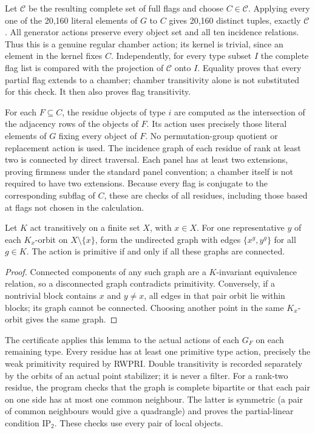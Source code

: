 \documentclass[11pt]{article}
\begin{document}
Let $\mathcal C$ be the resulting complete set of full flags and choose
$C\in\mathcal C$. Applying every one of the 20,160 literal elements of
$G$ to $C$ gives 20,160 distinct tuples, exactly $\mathcal C$. All generator
actions preserve every object set and all ten incidence relations. Thus
this is a genuine regular chamber action; its kernel is trivial, since
an element in the kernel fixes $C$. Independently, for every type subset
$I$ the complete flag list is compared with the projection of $\mathcal C$
onto $I$. Equality proves that every partial flag extends to a chamber;
chamber transitivity alone is not substituted for this check. It then also
proves flag transitivity.

For each $F\subseteq C$, the residue objects of type $i$ are computed as
the intersection of the adjacency rows of the objects of $F$. Its action
uses precisely those literal elements of $G$ fixing every object of $F$.
No permutation-group quotient or replacement action is used. The incidence
graph of each residue of rank at least two is connected by direct traversal.
Each panel has at least two extensions, proving firmness under the standard
panel convention; a chamber itself is not required to have two extensions.
Because every flag is conjugate to the corresponding subflag of $C$, these
are checks of all residues, including those based at flags not chosen in
the calculation.

\begin{lemma}
Let $K$ act transitively on a finite set $X$, with $x\in X$. For one
representative $y$ of each $K_x$-orbit on $X\setminus\{x\}$, form the
undirected graph with edges $\{x^g,y^g\}$ for all $g\in K$.
The action is primitive if and only if all these graphs are connected.
\end{lemma}
\begin{proof}
Connected components of any such graph are a $K$-invariant equivalence
relation, so a disconnected graph contradicts primitivity. Conversely, if
a nontrivial block contains $x$ and $y\ne x$, all edges in that pair orbit
lie within blocks; its graph cannot be connected. Choosing another point
in the same $K_x$-orbit gives the same graph.
\end{proof}

The certificate applies this lemma to the actual actions of each $G_F$
on each remaining type. Every residue has at least one primitive type
action, precisely the weak primitivity required by RWPRI. Double
transitivity is recorded separately by the orbits of an actual point
stabilizer; it is never a filter. For a rank-two residue, the program
checks that the graph is complete bipartite or that each pair on one side
has at most one common neighbour. The latter is symmetric (a pair of
common neighbours would give a quadrangle) and proves the partial-linear
condition $\mathrm{IP}_2$. These checks use every pair of local objects.
\end{document}
